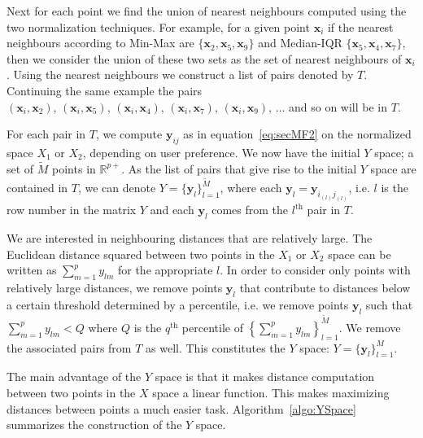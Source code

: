 \documentclass[a4paper,11pt]{article}
\begin{document}
Next for each point we find the union of nearest neighbours computed using the two normalization techniques. For example, for a given point $\bm{x}_i$ if the nearest neighbours according to Min-Max are $\{\bm{x}_2, \bm{x}_5, \bm{x}_9 \}$ and Median-IQR   $\{\bm{x}_5, \bm{x}_4, \bm{x}_7 \}$, then we consider the union of these two sets as the set of nearest neighbours of $\bm{x}_i$. Using the nearest neighbours we construct a list of pairs denoted by $T$. Continuing the same example the pairs $(\bm{x}_i, \bm{x}_2), \,  (\bm{x}_i, \bm{x}_5), \, (\bm{x}_i, \bm{x}_4), \,  (\bm{x}_i, \bm{x}_7), \, (\bm{x}_i, \bm{x}_9), \, \ldots $ and so on will be in $T$.

For each pair in $T$, we compute $\bm{y}_{ij}$ as in equation~\eqref{eq:secMF2} on the normalized space $X_1$ or $X_2$, depending on user preference. We now have the initial $Y$ space; a set of $\tilde{M}$ points in $\mathbb{R}^{p+}$. As the list of pairs that give rise to the initial $Y$ space are contained in $T$, we can denote $Y = \{ \bm{y}_l \}_{l=1}^{\tilde{M}}$, where each $\bm{y}_l = \bm{y}_{i_{(l)} j_{(l)} }$, i.e. $l$ is the row number in the matrix $Y$ and each $\bm{y}_l$ comes from the $l^{\text{th}}$ pair in $T$.

We are interested in neighbouring distances that are relatively large. The Euclidean distance squared between two points in the $X_1$ or $X_2$ space  can be written as $\sum_{m=1}^p y_{lm}$ for the appropriate $l$. In order to consider only points with relatively large distances, we remove points $\bm{y}_l$ that contribute to distances below a certain threshold determined by a percentile, i.e. we remove points $\bm{y}_l$ such that  $\sum_{m=1}^p y_{lm} < Q$ where $Q$ is the $q^{\text{th}}$ percentile of $ \left \{\sum_{m=1}^p y_{lm} \right \}_{l=1}^{\tilde{M}}$. We remove the associated pairs from $T$ as well. This constitutes the $Y$ space: $Y = \{\bm{y}_l \}_{l=1}^M$.

The main advantage of the $Y$ space is that it makes distance computation  between two points in the $X$ space a linear function. This makes maximizing distances between points a much easier task.
Algorithm~\ref{algo:YSpace} summarizes the construction of the $Y$ space.
\end{document}
